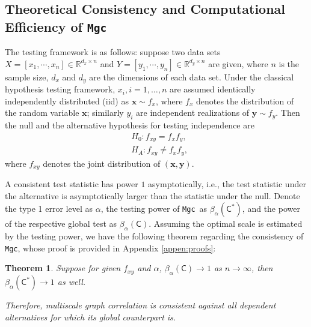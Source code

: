 \documentclass[11pt]{article}
\providecommand{\sct}[1]{{\sc \texttt{#1}}}
\providecommand{\mb}[1]{\boldsymbol{#1}}
\newcommand{\Real}{\mathbb{R}}
\newcommand{\G}{\mathsf{C}}
\newcommand{\Mgc}{\sct{Mgc}}
\newtheorem{thm}{Theorem}
\begin{document}
\subsection{Theoretical Consistency and Computational Efficiency of \Mgc}
\label{main2}
The testing framework is as follows: suppose two data sets $X=[x_{1},\cdots, x_{n}] \in \Real^{d_{x} \times n}$ and $Y=[y_{1},\cdots, y_{n}] \in \Real^{d_{y} \times n}$ are given, where $n$ is the sample size, $d_{x}$ and $d_{y}$ are the dimensions of each data set. Under the classical hypothesis testing framework, $x_{i}, i=1,\ldots,n$ are assumed identically independently distributed (iid) as $\mb{x} \sim f_{x}$, where $f_{x}$ denotes the distribution of the random variable $\mb{x}$; similarly $y_{i}$ are independent realizations of $\mb{y} \sim f_{y}$. Then the null and the alternative hypothesis for testing independence are
\begin{align*}
& H_{0}: f_{xy}=f_{x}f_{y},\\
& H_{A}: f_{xy} \neq f_{x}f_{y},
\end{align*}
where $f_{xy}$ denotes the joint distribution of $(\mb{x},\mb{y})$. 

A consistent test statistic has power $1$ asymptotically, i.e., the test statistic under the alternative is asymptotically larger than the statistic under the null. Denote the type 1 error level as $\alpha$, the testing power of \Mgc~as $\beta_{\alpha}(\G^{*})$, and the power of the respective global test as $\beta_{\alpha}(\G)$. Assuming the optimal scale is estimated by the testing power, we have the following theorem regarding the consistency of \Mgc, whose proof is provided in Appendix \ref{appen:proofs}:
\begin{thm}
\label{thm1}
Suppose for given $f_{xy}$ and $\alpha$, $\beta_{\alpha}(\G) \rightarrow 1$ as $n \rightarrow \infty$, then $\beta_{\alpha}(\G^{*}) \rightarrow 1$ as well.

Therefore, multiscale graph correlation is consistent against all dependent alternatives for which its global counterpart is.
\end{thm}

\end{document}
